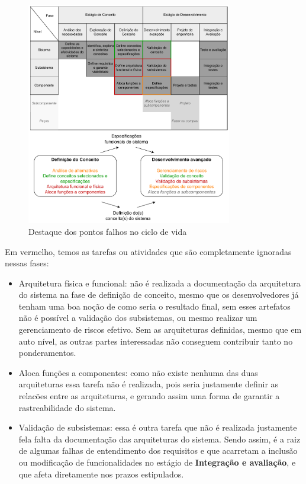 	\begin{figure}[H]
		\centering
		\includegraphics[width=0.8\textwidth]{./figuras/lifeCycleIssues.pdf}
		\caption{Destaque dos pontos falhos no ciclo de vida}
		\label{fig:metodologia:lifeCycleIssues}
	\end{figure}

	Em vermelho, temos as tarefas ou atividades que são completamente ignoradas nessas fases:
	\begin{itemize}
		\item Arquitetura física e funcional: não é realizada a documentação da arquitetura do sistema na fase de definição de conceito, mesmo que os
		desenvolvedores já tenham uma boa noção de como seria o resultado final, sem esses artefatos não é possível a validação dos subsistemas, ou mesmo realizar um gerenciamento
		de riscos efetivo. Sem as arquiteturas definidas, mesmo que em auto nível, as outras partes interessadas não conseguem contribuir tanto no ponderamentos.
		\item Aloca funções a componentes: como não existe nenhuma das duas arquiteturas essa tarefa não é realizada, pois seria justamente definir as relacões entre as arquiteturas,
		e gerando assim uma forma de garantir a rastreabilidade do sistema.
		\item Validação de subsistemas: essa é outra tarefa que não é realizada justamente fela falta da documentação das arquiteturas do sistema. Sendo assim, é a raiz de algumas falhas de entendimento
		dos requisitos e que acarretam a inclusão ou modificação de funcionalidades no estágio de \textbf{Integração e avaliação}, e que afeta diretamente nos prazos estipulados.
	\end{itemize}

